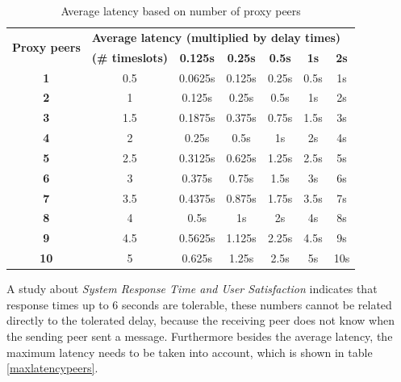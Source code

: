 \begin{longtable}{|c|c|c|c|c|c|c|}
\caption{Average latency based on number of proxy peers}
\label{avglatencypeers}\\
\hline
\multirow{2}{*}{\textbf{Proxy peers}} & \multicolumn{6}{|l|}{\textbf{Average latency (multiplied by delay times)}} \\
& \textbf{(\# timeslots)} & \textbf{0.125s} & \textbf{0.25s} & \textbf{0.5s} & \textbf{1s} & \textbf{2s}\\
\hline
\textbf{1} & 0.5 & 0.0625s & 0.125s & 0.25s & 0.5s & 1s\\
\hline
\textbf{2} & 1 & 0.125s & 0.25s & 0.5s & 1s & 2s\\
\hline
\textbf{3} & 1.5 & 0.1875s & 0.375s & 0.75s & 1.5s & 3s\\
\hline
\textbf{4} & 2 & 0.25s & 0.5s & 1s & 2s & 4s\\
\hline
\textbf{5} & 2.5 & 0.3125s & 0.625s & 1.25s & 2.5s & 5s\\
\hline
\textbf{6} & 3 & 0.375s & 0.75s & 1.5s & 3s & 6s\\
\hline
\textbf{7} & 3.5 & 0.4375s & 0.875s & 1.75s & 3.5s & 7s\\
\hline
\textbf{8} & 4 & 0.5s & 1s & 2s & 4s & 8s\\
\hline
\textbf{9} & 4.5 & 0.5625s & 1.125s & 2.25s & 4.5s & 9s\\
\hline
\textbf{10} & 5 & 0.625s & 1.25s & 2.5s & 5s & 10s\\
\hline
\end{longtable}
A study about 
\textit{System Response Time and User Satisfaction}\cite{responsetime}
indicates that response times up to 6 seconds are tolerable, these numbers
cannot be related directly to the tolerated delay, because the receiving
peer does not know when the sending peer sent a message.
Furthermore besides the average latency, the maximum latency needs
to be taken into account, which is shown in table \ref{maxlatencypeers}.
